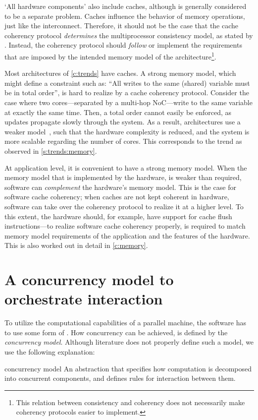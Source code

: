 `All hardware components' also include caches, although  is generally considered to be a separate problem.
Caches influence the behavior of memory operations, just like the interconnect.
Therefore, it should not be the case that the cache coherency protocol \emph{determines} the multiprocessor consistency model, as stated by \citet{stenstrom:cache_coherency}.
Instead, the coherency protocol should \emph{follow} or implement the requirements that are imposed by the intended memory model of the architecture\footnote{%
	This relation between consistency and coherency does not necessarily make coherency protocols easier to implement.}.

Most architectures of \cref{c:trends} have caches.
A strong memory model, which might define a constraint such as: ``All writes to the same (shared) variable must be in total order'', is hard to realize by a cache coherency protocol.
Consider the case where two cores---separated by a multi-hop \ac{NoC}---write to the same variable at exactly the same time.
Then, a total order cannot easily be enforced, as updates propagate slowly through the system.
As a result, architectures use a weaker model~\cite{adve:rethinking}, such that the hardware complexity is reduced, and the system is more scalable regarding the number of cores.
This corresponds to the trend as observed in \cref{s:trends:memory}.

At application level, it is convenient to have a strong memory model.
When the memory model that is implemented by the hardware, is weaker than required, software can \emph{complement} the hardware's memory model.
This is the case for software cache coherency; when caches are not kept coherent in hardware, software can take over the coherency protocol to realize it at a higher level.
To this extent, the hardware should, for example, have support for cache flush instructions---to realize software cache coherency properly, \codesign* is required to match memory model requirements of the application and the features of the hardware.
This is also worked out in detail in \cref{c:memory}.


\section{A concurrency model to orchestrate interaction}
\label{s:progmodel:concurrency}

To utilize the computational capabilities of a parallel machine, the software has to use some form of .
How concurrency can be achieved, is defined by the \emph{concurrency model}.
Although literature does not properly define such a model, we use the following explanation:
\begin{describe}{concurrency model}
	An abstraction that specifies how computation is decomposed into concurrent components, and defines rules for interaction between them.
\end{describe}

